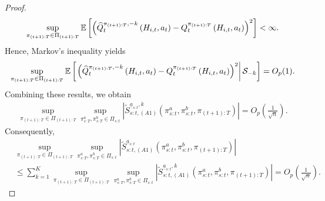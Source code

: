 \begin{proof}
\begin{align*}
    \sup_{\pi_{(t+1):T} \in \Pi_{(t+1):T}}\mathbb{E}\left[\left(\widehat{Q}_{t}^{\pi_{(t+1):T},-k}\left(H_{i,t},a_{t}\right)-Q_{t}^{\pi_{(t+1):T}}\left(H_{i,t},a_{t}\right)\right)^2\right]<\infty.
\end{align*}
Hence, Markov's inequality yields
\begin{align*}
    \sup_{\pi_{(t+1):T} \in \Pi_{(t+1):T}} \mathbb{E}\left[\left.\left(\widehat{Q}_{t}^{\pi_{(t+1):T},-k}\left(H_{i,t},a_{t}\right)-Q_{t}^{\pi_{(t+1):T}}\left(H_{i,t},a_{t}\right)\right)^2\right|\mathcal{S}_{-k} \right] = O_p(1).
\end{align*}
Combining these results, we obtain
\begin{align}
    \sup_{\pi_{(t+1):T} \in \Pi_{(t+1):T}}\sup_{\pi_{s:T}^{a},\pi_{s:T}^{b}\in \Pi_{s:t}}\left|\widetilde{S}_{s:t,(A1)}^{\underline{a}_{s:t},k}(\pi_{s:t}^{a},\pi_{s:t}^{b},\pi_{(t+1):T})\right| = O_p \left(\frac{1}{\sqrt{n}}\right). \label{eq:A1_convergence}
\end{align}
Consequently, 
\begin{align*}
    &\sup_{\pi_{(t+1):T} \in \Pi_{(t+1):T}}\sup_{\pi_{s:T}^{a},\pi_{s:T}^{b}\in \Pi_{s:t}}\left|\widetilde{S}_{s:t,(A1)}^{\underline{a}_{s:t}}(\pi_{s:t}^{a},\pi_{s:t}^{b},\pi_{(t+1):T})\right| \\
    &\leq  \sum_{k=1}^{K}\sup_{\pi_{(t+1):T} \in \Pi_{(t+1):T}}\sup_{\pi_{s:T}^{a},\pi_{s:T}^{b}\in \Pi_{s:t}}\left|\widetilde{S}_{s:t,(A1)}^{\underline{a}_{s:t},k}(\pi_{s:t}^{a},\pi_{s:t}^{b},\pi_{(t+1):T})\right| = O_p \left(\frac{1}{\sqrt{n}}\right).
\end{align*}


\end{proof}
